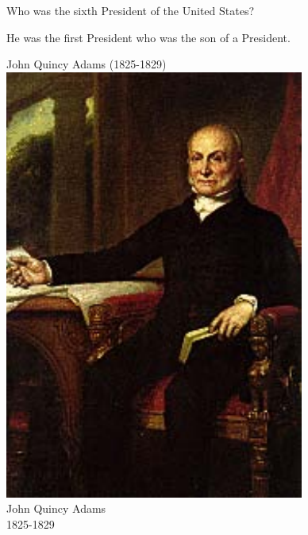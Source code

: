 \documentclass{article}
\def\rescale{.4} %
\begin{document}
\begin{card}[hint]
    Who was the sixth President of the United States?
    \begin{response}
        \begin{hint}
            He was the first President who was the son of a President.
        \end{hint}
        \begin{answer}
        \ifecListing
            John Quincy Adams (1825-1829)
        \else\centering
            \includegraphics[scale=\rescale]{presidents/ja6}\\
            John Quincy Adams\\
            1825-1829
        \fi
        \end{answer}
    \end{response}
\end{card}
\end{document}
